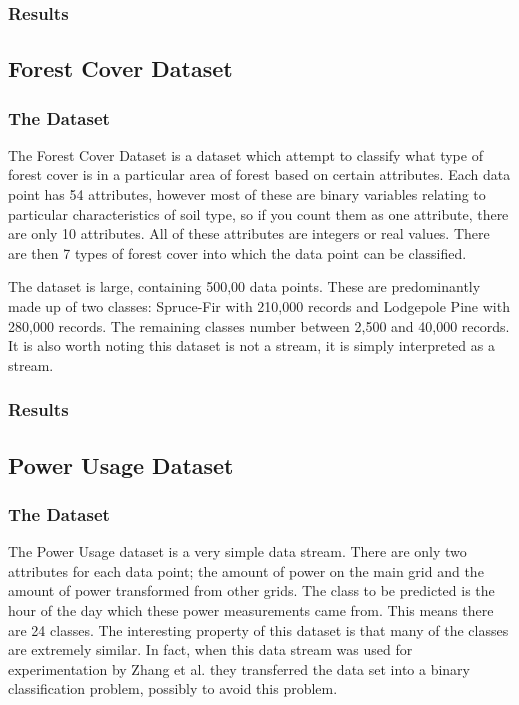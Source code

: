 \documentclass[12pt,a4paper,oneside]{report}
\begin{document}
\subsubsection*{Results}

\subsection*{Forest Cover Dataset}
\subsubsection*{The Dataset}

The Forest Cover Dataset is a dataset which attempt to classify what type of forest cover is in a particular area of forest based on certain attributes. Each data point has 54 attributes, however most of these are binary variables relating to particular characteristics of soil type, so if you count them as one attribute, there are only 10 attributes. All of these attributes are integers or real values.  There are then 7 types of forest cover into which the data point can be classified. 

The dataset is large, containing 500,00 data points. These are predominantly made up of two classes: Spruce-Fir with 210,000 records and Lodgepole Pine with 280,000 records. The remaining classes number between 2,500 and 40,000 records. It is also worth noting this dataset is not a stream, it is simply interpreted as a stream. 


\subsubsection*{Results}

\subsection*{Power Usage Dataset}
\subsubsection*{The Dataset}
The Power Usage dataset is a very simple data stream. There are only two attributes for each data point; the amount of power on the main grid and the amount of power transformed from other grids. The class to be predicted is the hour of the day which these power measurements came from. This means there are 24 classes. The interesting property of this dataset is that many of the classes are extremely similar. In fact, when this data stream was used for experimentation by Zhang et al.\cite{Zhang} they transferred the data set into a binary classification problem, possibly to avoid this problem. 
\end{document}
